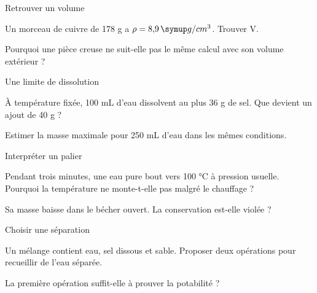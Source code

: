 \par\noindent\begin{minipage}{\linewidth}
\begin{exercice}[2]{Retrouver un volume}
\begin{questions}
\item Un morceau de cuivre de 178 g a $\rho=8{,}9\unite{g/cm^3}$. Trouver V.
\item Pourquoi une pièce creuse ne suit-elle pas le même calcul avec son volume extérieur ?
\end{questions}
\end{exercice}
\end{minipage}
\par\noindent\begin{minipage}{\linewidth}
\begin{exercice}[2]{Une limite de dissolution}
\begin{questions}
\item À température fixée, 100 mL d’eau dissolvent au plus 36 g de sel. Que devient un ajout de 40 g ?
\item Estimer la masse maximale pour 250 mL d’eau dans les mêmes conditions.
\end{questions}
\end{exercice}
\end{minipage}
\par\noindent\begin{minipage}{\linewidth}
\begin{exercice}[2]{Interpréter un palier}
\begin{questions}
\item Pendant trois minutes, une eau pure bout vers 100 °C à pression usuelle. Pourquoi la température ne monte-t-elle pas malgré le chauffage ?
\item Sa masse baisse dans le bécher ouvert. La conservation est-elle violée ?
\end{questions}
\end{exercice}
\end{minipage}
\clearpage{}
\par\noindent\begin{minipage}{\linewidth}
\begin{exercice}[3]{Choisir une séparation}
\begin{questions}
\item Un mélange contient eau, sel dissous et sable. Proposer deux opérations pour recueillir de l’eau séparée.
\item La première opération suffit-elle à prouver la potabilité ?
\end{questions}
\end{exercice}
\end{minipage}
